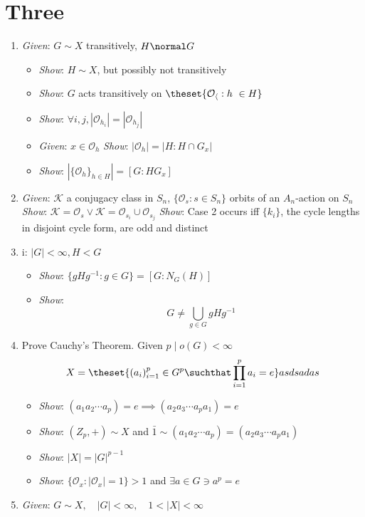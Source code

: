 \hypertarget{three}{%
\section{Three}\label{three}}

\begin{enumerate}
\def\labelenumi{\arabic{enumi}.}
\item
  \emph{Given}: $G \sim X$ transitively, $H \normal G$

  \begin{itemize}
  \tightlist
  \item
    \emph{Show}: $H \sim X$, but possibly not transitively
  \item
    \emph{Show}: $G$ acts transitively on
    $\theset{ \mathcal{O_h} : h\ \in H}$
  \item
    \emph{Show}:
    $\forall i, j, |\mathcal{O}_{h_i}| = |\mathcal{O}_{h_j}|$
  \item
    \emph{Given}: $x\in \mathcal{O}_h$ \emph{Show}:
    $|\mathcal{O}_h| = |H : H \cap G_x|$
  \item
    \emph{Show}: $|\{\mathcal{O}_h\}_{h\in H}| = [G : HG_x]$
  \end{itemize}
\item
  \emph{Given}: $\mathcal{K}$ a conjugacy class in $S_n$,
  $\{\mathcal{O}_{s}:s\in S_n\}$ orbits of an $A_n$-action on $S_n$
  \emph{Show}:
  $\mathcal{K} = \mathcal{O}_s \vee \mathcal{K} = \mathcal{O}_{s_i} \cup \mathcal{O}_{s_j}$
  \emph{Show}: Case 2 occurs iff $\{k_i\}$, the cycle lengths in
  disjoint cycle form, are odd and distinct
\item
  i: $|G| < \infty, H < G$

  \begin{itemize}
  \tightlist
  \item
    \emph{Show}: $\{ gHg^{-1} : g\in G\} = [G : N_G(H)]$
  \item
    \emph{Show}: $$G \neq \bigcup_{g\in G} gHg^{-1}$$
  \end{itemize}
\item
  Prove Cauchy's Theorem. Given $p\mid o(G) <\infty$
  $$
  X = \theset{ (a_{i})_{i=1}^p \in G^p \suchthat \prod_{i=1}^p a_i = e} \\
  asdsadas
  $$

  \begin{itemize}
  \tightlist
  \item
    \emph{Show}:
    $(a_1 a_2\cdots a_p) = e \implies (a_2 a_3 \cdots a_p a_1) = e$
  \item
    \emph{Show}: $(Z_p, +) \sim X$ and
    $\bar 1 \sim (a_1 a_2 \cdots a_p) = (a_2 a_3 \cdots a_p a_1)$
  \item
    \emph{Show}: $|X| = |G|^{p-1}$
  \item
    \emph{Show}: $\{ \mathcal{O}_x : |\mathcal{O}_x| = 1 \} > 1$ and
    $\exists a \in G \ni a^p = e$
  \end{itemize}
\item
  \emph{Given}: $G \sim X, \quad |G| < \infty , \quad 1 < |X| < \infty$
\end{enumerate}

